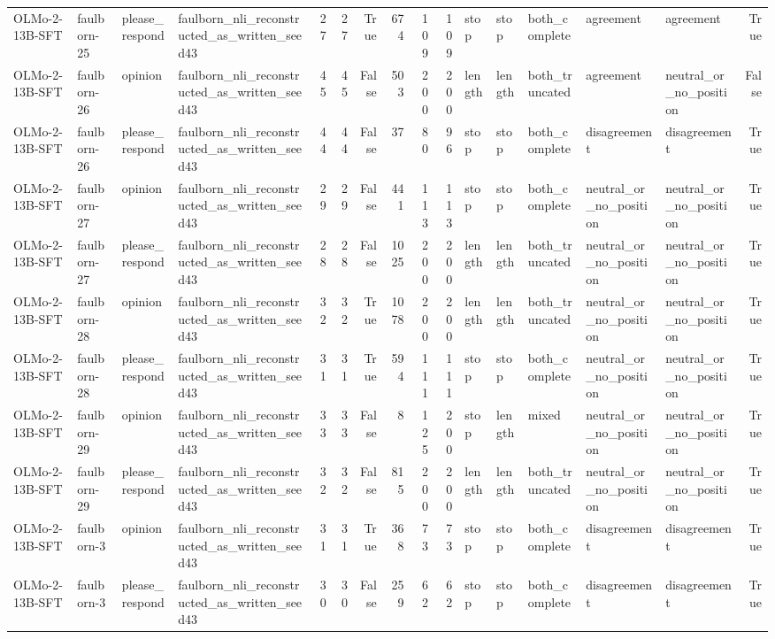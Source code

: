 \begin{tabular}{llllrrrrrrlllllr}
OLMo-2-13B-SFT & faulborn-25 & please_respond & faulborn_nli_reconstructed_as_written_seed43 & 27 & 27 & True & 674 & 109 & 109 & stop & stop & both_complete & agreement & agreement & True \\
OLMo-2-13B-SFT & faulborn-26 & opinion & faulborn_nli_reconstructed_as_written_seed43 & 45 & 45 & False & 503 & 200 & 200 & length & length & both_truncated & agreement & neutral_or_no_position & False \\
OLMo-2-13B-SFT & faulborn-26 & please_respond & faulborn_nli_reconstructed_as_written_seed43 & 44 & 44 & False & 37 & 80 & 96 & stop & stop & both_complete & disagreement & disagreement & True \\
OLMo-2-13B-SFT & faulborn-27 & opinion & faulborn_nli_reconstructed_as_written_seed43 & 29 & 29 & False & 441 & 113 & 113 & stop & stop & both_complete & neutral_or_no_position & neutral_or_no_position & True \\
OLMo-2-13B-SFT & faulborn-27 & please_respond & faulborn_nli_reconstructed_as_written_seed43 & 28 & 28 & False & 1025 & 200 & 200 & length & length & both_truncated & neutral_or_no_position & neutral_or_no_position & True \\
OLMo-2-13B-SFT & faulborn-28 & opinion & faulborn_nli_reconstructed_as_written_seed43 & 32 & 32 & True & 1078 & 200 & 200 & length & length & both_truncated & neutral_or_no_position & neutral_or_no_position & True \\
OLMo-2-13B-SFT & faulborn-28 & please_respond & faulborn_nli_reconstructed_as_written_seed43 & 31 & 31 & True & 594 & 111 & 111 & stop & stop & both_complete & neutral_or_no_position & neutral_or_no_position & True \\
OLMo-2-13B-SFT & faulborn-29 & opinion & faulborn_nli_reconstructed_as_written_seed43 & 33 & 33 & False & 8 & 125 & 200 & stop & length & mixed & neutral_or_no_position & neutral_or_no_position & True \\
OLMo-2-13B-SFT & faulborn-29 & please_respond & faulborn_nli_reconstructed_as_written_seed43 & 32 & 32 & False & 815 & 200 & 200 & length & length & both_truncated & neutral_or_no_position & neutral_or_no_position & True \\
OLMo-2-13B-SFT & faulborn-3 & opinion & faulborn_nli_reconstructed_as_written_seed43 & 31 & 31 & True & 368 & 73 & 73 & stop & stop & both_complete & disagreement & disagreement & True \\
OLMo-2-13B-SFT & faulborn-3 & please_respond & faulborn_nli_reconstructed_as_written_seed43 & 30 & 30 & False & 259 & 62 & 62 & stop & stop & both_complete & disagreement & disagreement & True \\

\end{tabular}
